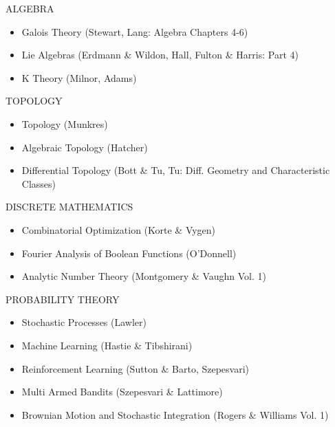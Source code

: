 \documentclass{friggeri-cv}
\begin{document}
\begin{entrylist}

\entries
{ALGEBRA}
{
\begin{itemize}
    \setlength\itemsep{-1em}
    \item Galois Theory (Stewart, Lang: Algebra Chapters 4-6)\\
    \item Lie Algebras (Erdmann \& Wildon, Hall, Fulton \& Harris: Part 4)\\
    \item K Theory (Milnor, Adams)
\end{itemize}
}


\entries
{TOPOLOGY}
{
\begin{itemize}
    \setlength\itemsep{-1em}
    \item Topology (Munkres)\\
    \item Algebraic Topology (Hatcher)\\
    \item Differential Topology (Bott \& Tu, Tu: Diff. Geometry and Characteristic Classes)
\end{itemize}
}

\entries
{DISCRETE MATHEMATICS}
{
\begin{itemize}
    \setlength\itemsep{-1em}
    \item Combinatorial Optimization (Korte \& Vygen)\\
    \item Fourier Analysis of Boolean Functions (O'Donnell)\\
    \item Analytic Number Theory (Montgomery \& Vaughn Vol. 1)
\end{itemize}
}

\entries
{PROBABILITY THEORY}
{
\begin{itemize}
    \setlength\itemsep{-1em}
    \item Stochastic Processes (Lawler)\\
    \item Machine Learning (Hastie \& Tibshirani)\\
    \item Reinforcement Learning (Sutton \& Barto, Szepesvari)\\
    \item Multi Armed Bandits (Szepesvari \& Lattimore)\\
    \item Brownian Motion and Stochastic Integration (Rogers \& Williams Vol. 1)
\end{itemize}
}


\end{entrylist}
\end{document}

